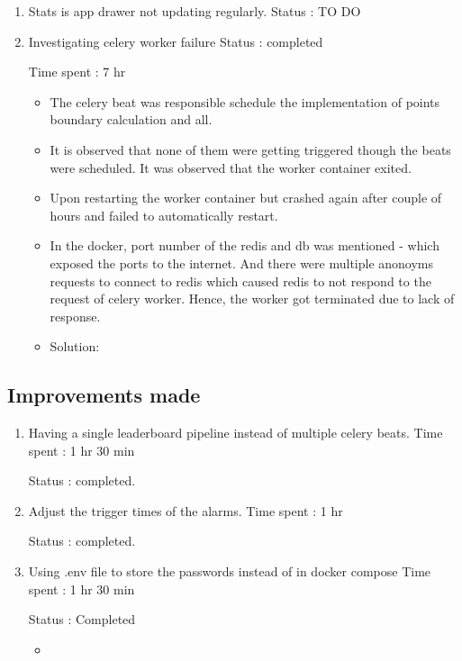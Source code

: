 \documentclass{article}
\begin{document}
\begin{enumerate}
    \item Stats is app drawer not updating regularly.
    Status : TO DO 

    \item Investigating celery worker failure
    Status : completed

    Time spent : 7 hr
    \begin{itemize}
        \item The celery beat was responsible schedule the implementation of points boundary calculation and all.
        \item It is observed that none of them were getting triggered though the beats were scheduled. It was observed that the worker container exited.
        \item Upon restarting the worker container but crashed again after couple of hours and failed to automatically restart.
        \item In the docker, port number of the redis and db was mentioned - which exposed the ports to the internet. And there were multiple anonoyms requests to connect to redis which caused redis to not respond to the request of celery worker. Hence, the worker got terminated due to lack of response.
        \item Solution: 
    \end{itemize}
\end{enumerate}

\subsection{Improvements made}
\begin{enumerate}
    \item Having a single leaderboard pipeline instead of multiple celery beats.
    Time spent : 1 hr 30 min

    Status : completed.
    \item Adjust the trigger times of the alarms.
    Time spent : 1 hr
    
    Status : completed.
    \item Using .env file to store the passwords instead of in docker compose
    Time spent : 1 hr 30 min

    Status : Completed
    \begin{itemize}
        \item 
    \end{itemize}
\end{enumerate}




\newpage
\printbibliography
\end{document}
